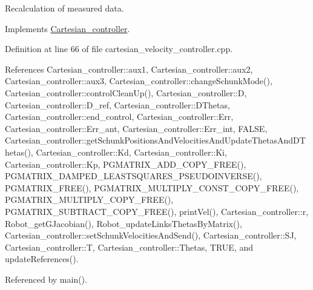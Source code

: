 Recalculation of measured data. 

Implements \hyperlink{classCartesian__controller_a8809167cab6d338a957439141fa2bf6c}{Cartesian\-\_\-controller}.



Definition at line 66 of file cartesian\-\_\-velocity\-\_\-controller.\-cpp.



References Cartesian\-\_\-controller\-::aux1, Cartesian\-\_\-controller\-::aux2, Cartesian\-\_\-controller\-::aux3, Cartesian\-\_\-controller\-::change\-Schunk\-Mode(), Cartesian\-\_\-controller\-::control\-Clean\-Up(), Cartesian\-\_\-controller\-::\-D, Cartesian\-\_\-controller\-::\-D\-\_\-ref, Cartesian\-\_\-controller\-::\-D\-Thetas, Cartesian\-\_\-controller\-::end\-\_\-control, Cartesian\-\_\-controller\-::\-Err, Cartesian\-\_\-controller\-::\-Err\-\_\-ant, Cartesian\-\_\-controller\-::\-Err\-\_\-int, F\-A\-L\-S\-E, Cartesian\-\_\-controller\-::get\-Schunk\-Positions\-And\-Velocities\-And\-Update\-Thetas\-And\-D\-Thetas(), Cartesian\-\_\-controller\-::\-Kd, Cartesian\-\_\-controller\-::\-Ki, Cartesian\-\_\-controller\-::\-Kp, P\-G\-M\-A\-T\-R\-I\-X\-\_\-\-A\-D\-D\-\_\-\-C\-O\-P\-Y\-\_\-\-F\-R\-E\-E(), P\-G\-M\-A\-T\-R\-I\-X\-\_\-\-D\-A\-M\-P\-E\-D\-\_\-\-L\-E\-A\-S\-T\-S\-Q\-U\-A\-R\-E\-S\-\_\-\-P\-S\-E\-U\-D\-O\-I\-N\-V\-E\-R\-S\-E(), P\-G\-M\-A\-T\-R\-I\-X\-\_\-\-F\-R\-E\-E(), P\-G\-M\-A\-T\-R\-I\-X\-\_\-\-M\-U\-L\-T\-I\-P\-L\-Y\-\_\-\-C\-O\-N\-S\-T\-\_\-\-C\-O\-P\-Y\-\_\-\-F\-R\-E\-E(), P\-G\-M\-A\-T\-R\-I\-X\-\_\-\-M\-U\-L\-T\-I\-P\-L\-Y\-\_\-\-C\-O\-P\-Y\-\_\-\-F\-R\-E\-E(), P\-G\-M\-A\-T\-R\-I\-X\-\_\-\-S\-U\-B\-T\-R\-A\-C\-T\-\_\-\-C\-O\-P\-Y\-\_\-\-F\-R\-E\-E(), print\-Vel(), Cartesian\-\_\-controller\-::r, Robot\-\_\-get\-G\-Jacobian(), Robot\-\_\-update\-Links\-Thetas\-By\-Matrix(), Cartesian\-\_\-controller\-::set\-Schunk\-Velocities\-And\-Send(), Cartesian\-\_\-controller\-::\-S\-J, Cartesian\-\_\-controller\-::\-T, Cartesian\-\_\-controller\-::\-Thetas, T\-R\-U\-E, and update\-References().



Referenced by main().


